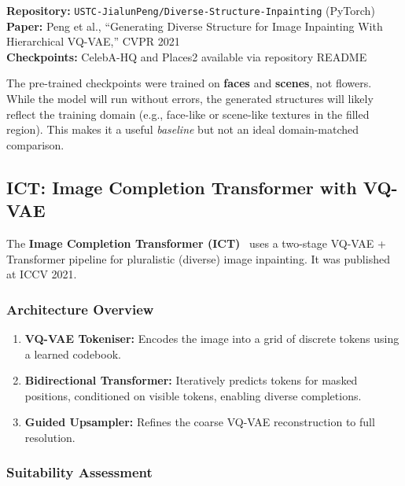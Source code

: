 \documentclass[11pt, a4paper]{article}
\begin{document}
\begin{graybox}[title={Reference Implementation}]
\textbf{Repository:} \texttt{USTC-JialunPeng/Diverse-Structure-Inpainting} (PyTorch) \\
\textbf{Paper:} Peng et al., ``Generating Diverse Structure for Image Inpainting With Hierarchical VQ-VAE,'' CVPR 2021 \\
\textbf{Checkpoints:} CelebA-HQ and Places2 available via repository README
\end{graybox}

\begin{warningbox}
The pre-trained checkpoints were trained on \textbf{faces} and \textbf{scenes}, not flowers. While the model will run without errors, the generated structures will likely reflect the training domain (e.g., face-like or scene-like textures in the filled region). This makes it a useful \emph{baseline} but not an ideal domain-matched comparison.
\end{warningbox}


\subsection{ICT: Image Completion Transformer with VQ-VAE}
\label{sec:ict}

The \textbf{Image Completion Transformer (ICT)}~\cite{wan2021ict} uses a two-stage VQ-VAE + Transformer pipeline for pluralistic (diverse) image inpainting. It was published at ICCV 2021.

\subsubsection{Architecture Overview}

\begin{enumerate}[leftmargin=2em]
  \item \textbf{VQ-VAE Tokeniser:} Encodes the image into a grid of discrete tokens using a learned codebook.
  \item \textbf{Bidirectional Transformer:} Iteratively predicts tokens for masked positions, conditioned on visible tokens, enabling diverse completions.
  \item \textbf{Guided Upsampler:} Refines the coarse VQ-VAE reconstruction to full resolution.
\end{enumerate}

\subsubsection{Suitability Assessment}
\end{document}
